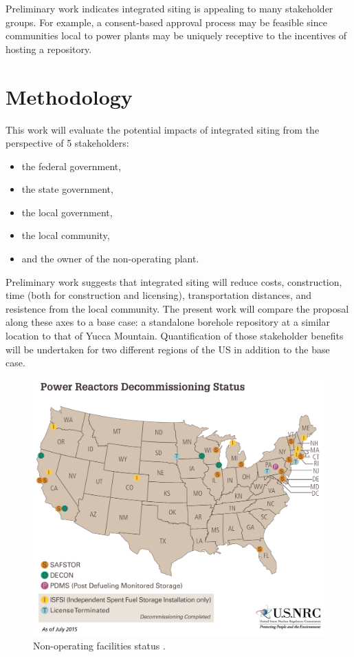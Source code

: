 \documentclass{anstrans}
\begin{document}
Preliminary work \cite{waleed_regional_2015} indicates integrated siting is 
appealing to many stakeholder groups. For example, a consent-based approval 
process may be feasible since communities local to power plants may be uniquely 
receptive to the incentives of hosting a repository.  


\section{Methodology}

This work will evaluate the potential impacts of integrated siting from the 
perspective of 5 stakeholders:
\begin{itemize}
        \item the federal government,
        \item the state government,
        \item the local government,
        \item the local community,
        \item and the owner of the non-operating plant.
\end{itemize}


Preliminary work \cite{waleed_regional_2015} suggests that integrated siting 
will reduce costs, construction, time (both for construction and licensing), 
transportation distances, and resistence from the local community.  The present 
work will compare the proposal along these axes to a base case: a standalone 
borehole repository at a similar location to that of Yucca Mountain.  
Quantification of those stakeholder benefits will be undertaken for two 
different regions of the US in addition to the base case.  


\begin{figure}[!h] 
  \centering
  \includegraphics[width=0.8\columnwidth]{power-reactors-decommissioning}	
  \caption{Non-operating facilities status
  \cite{nuclear_regulatory_commission_nrc_2015}.}
  \label{fig:shutdown}
\end{figure}
\end{document}
